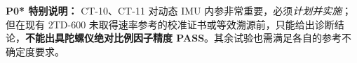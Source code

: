 \normalsize
\begin{keynote}
\textbf{P0* 特别说明：} CT-10、CT-11 对动态 IMU 内参非常重要，必须\emph{计划并实施}；但在现有 2TD-600 未取得速率参考的校准证书或等效溯源前，只能给出诊断结论，\textbf{不能出具陀螺仪绝对比例因子精度 PASS}。其余试验也需满足各自的参考不确定度要求。
\end{keynote}
